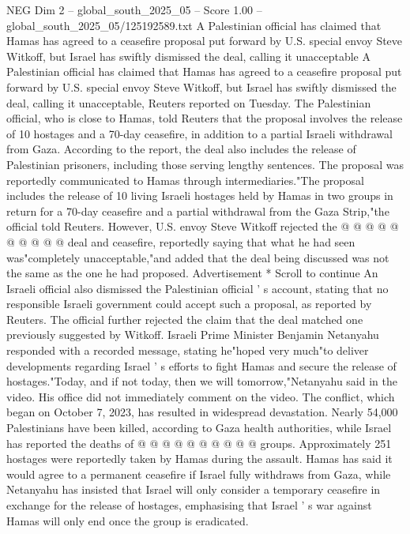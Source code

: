 \begin{textsample}{NEG Dim 2 – global\_south\_2025\_05 – Score 1.00 – global\_south\_2025\_05/125192589.txt}  \label{ex:f2_neg_403}
A Palestinian official has claimed that Hamas has agreed to a ceasefire proposal put forward by U.S. special envoy Steve Witkoff, but Israel has swiftly dismissed the deal, calling it unacceptable A Palestinian official has claimed that Hamas has agreed to a ceasefire proposal put forward by U.S. special envoy Steve Witkoff, but Israel has swiftly dismissed the deal, calling it unacceptable, Reuters reported on Tuesday.
The Palestinian official, who is close to Hamas, told Reuters that the proposal involves the release of 10 hostages and a 70-day ceasefire, in addition to a partial Israeli withdrawal from Gaza.
According to the report, the deal also includes the release of Palestinian prisoners, including those serving lengthy sentences.
The proposal was reportedly communicated to Hamas through intermediaries."The proposal includes the release of 10 living Israeli hostages held by Hamas in two groups in return for a 70-day ceasefire and a partial withdrawal from the Gaza Strip,"the official told Reuters.
However, U.S. envoy Steve Witkoff rejected the @ @ @ @ @ @ @ @ @ @ deal and ceasefire, reportedly saying that what he had seen was"completely unacceptable,"and added that the deal being discussed was not the same as the one he had proposed.
Advertisement * Scroll to continue An Israeli official also dismissed the Palestinian official ' s account, stating that no responsible Israeli government could accept such a proposal, as reported by Reuters.
The official further rejected the claim that the deal matched one previously suggested by Witkoff.
Israeli Prime Minister Benjamin Netanyahu responded with a recorded message, stating he"hoped very much"to deliver developments regarding Israel ' s efforts to fight Hamas and secure the release of hostages."Today, and if not today, then we will tomorrow,"Netanyahu said in the video.
His office did not immediately comment on the video.
The conflict, which began on October 7, 2023, has resulted in widespread devastation.
Nearly 54,000 Palestinians have been killed, according to Gaza health authorities, while Israel has reported the deaths of @ @ @ @ @ @ @ @ @ @ groups.
Approximately 251 hostages were reportedly taken by Hamas during the assault.
Hamas has said it would agree to a permanent ceasefire if Israel fully withdraws from Gaza, while Netanyahu has insisted that Israel will only consider a temporary ceasefire in exchange for the release of hostages, emphasising that Israel ' s war against Hamas will only end once the group is eradicated.

\end{textsample}
